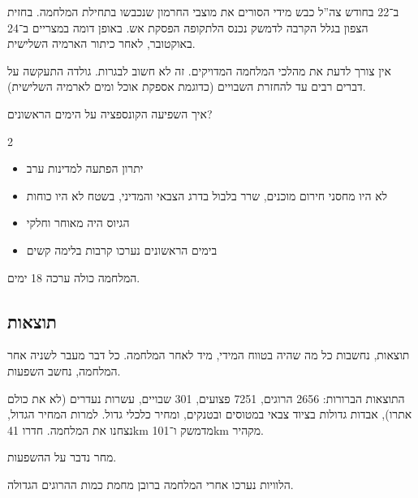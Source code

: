 \documentclass[]{../../../../tex/classes/styledArticle}
\begin{document}
	ב־22 בחודש צה''ל כבש מידי הסורים את מוצבי החרמון שנכבשו בתחילת המלחמה. בחזית הצפון בגלל הקרבה לדמשק נכנס הלתקופה הפסקת אש. באופן דומה במצריים ב־24 באוקטובר, לאחר כיתור הארמיה השלישית. 
	
	אין צורך לדעת את מהלכי המלחמה המדויקים. זה לא חשוב לבגרות. גולדה התעקשה על דברים רבים עד להחזרת השבויים (כדוגמת אספקת אוכל ומים לארמיה השלישית). 
	
	איך השפיעה הקונספציה על הימים הראשונים? 
	\begin{multicols}{2}
		\begin{itemize}
			\item יתרון הפתעה למדינות ערב
			\item לא היו מחסני חירום מוכנים, שרר בלבול בדרג הצבאי והמדיני, בשטח לא היו כוחות
			\item הגיוס היה מאוחר וחלקי
			\item בימים הראשונים נערכו קרבות בלימה קשים
		\end{itemize}
	\end{multicols}
	
	המלחמה כולה ערכה 18 ימים. 
	
	
	\subsection*{תוצאות}
	תוצאות, נחשבות כל מה שהיה בטווח המידי, מיד לאחר המלחמה. כל דבר מעבר לשניה אחר המלחמה, נחשב השפעות. 
	
	התוצאות הברורות: 2656 הרוגים, 7251 פצועים, 301 שבויים, עשרות נעדרים (לא את כולם אתרו), אבדות גדולות בציוד צבאי במטוסים ובטנקים, ומחיר כלכלי גדול. למרות המחיר הגדול, נצחנו את המלחמה. חדרו 41km מדמשק ו־101km מקהיר. 
	
	מחר נדבר על ההשפעות. 
	
	הלוויות נערכו אחרי המלחמה ברובן מחמת כמות ההרוגים הגדולה. 
	
\end{document}

